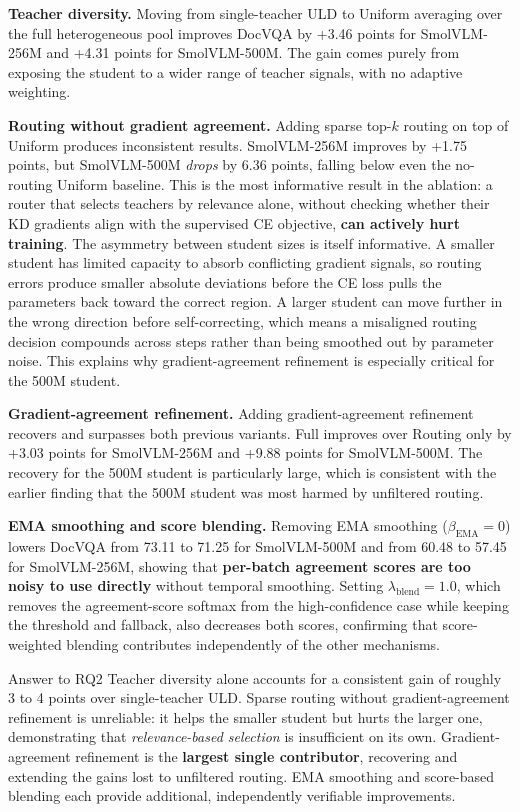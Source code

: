 \textbf{Teacher diversity.}
Moving from single-teacher ULD to Uniform averaging over the full
heterogeneous pool improves DocVQA by +3.46 points for SmolVLM-256M and
+4.31 points for SmolVLM-500M. The gain comes purely from exposing the
student to a wider range of teacher signals, with no adaptive weighting.

\textbf{Routing without gradient agreement.}
Adding sparse top-\(k\) routing on top of Uniform produces inconsistent
results. SmolVLM-256M improves by +1.75 points, but SmolVLM-500M
\emph{drops} by 6.36 points, falling below even the no-routing Uniform
baseline. This is the most informative result in the ablation: a router that
selects teachers by relevance alone, without checking whether their KD
gradients align with the supervised CE objective, \textbf{can actively hurt training}.
The asymmetry between student sizes is itself informative. A smaller student
has limited capacity to absorb conflicting gradient signals, so routing errors
produce smaller absolute deviations before the CE loss pulls the parameters
back toward the correct region. A larger student can move further in the
wrong direction before self-correcting, which means a misaligned routing
decision compounds across steps rather than being smoothed out by parameter
noise. This explains why gradient-agreement refinement is especially
critical for the 500M student.

\textbf{Gradient-agreement refinement.}
Adding gradient-agreement refinement recovers and surpasses both previous
variants. Full \methodname{} improves over Routing only by +3.03 points for
SmolVLM-256M and +9.88 points for SmolVLM-500M. The recovery for the 500M
student is particularly large, which is consistent with the earlier finding
that the 500M student was most harmed by unfiltered routing.

\textbf{EMA smoothing and score blending.}
Removing EMA smoothing (\(\beta_{\mathrm{EMA}}=0\)) lowers DocVQA from 73.11
to 71.25 for SmolVLM-500M and from 60.48 to 57.45 for SmolVLM-256M, showing
that \textbf{per-batch agreement scores are too noisy to use directly} without
temporal smoothing. Setting \(\lambda_{\mathrm{blend}}=1.0\), which removes
the agreement-score softmax from the high-confidence case while keeping the
threshold and fallback, also decreases both scores, confirming that
score-weighted blending contributes independently of the other mechanisms.

\begin{rqanswerbox}{Answer to RQ2}
Teacher diversity alone accounts for a consistent gain of roughly 3 to 4
points over single-teacher ULD. Sparse routing without gradient-agreement
refinement is unreliable: it helps the smaller student but hurts the larger
one, demonstrating that \textit{relevance-based selection} is insufficient on its own.
Gradient-agreement refinement is the \textbf{largest single contributor}, recovering
and extending the gains lost to unfiltered routing. EMA smoothing and
score-based blending each provide additional, independently verifiable
improvements.
\end{rqanswerbox}


